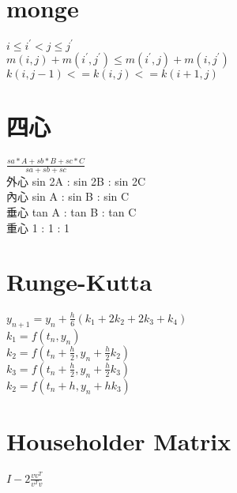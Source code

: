 \section{monge}
$i \leq i^{'} < j \leq j^{'}$ \\
$m(i,j)+m(i^{'},j^{'}) \leq m(i^{'},j)+m(i,j^{'})$ \\
$k(i,j-1)<=k(i,j)<=k(i+1,j)$

\section{四心}
$\frac{sa*A+sb*B+sc*C}{sa+sb+sc}$ \\
外心 sin 2A : sin 2B : sin 2C \\
內心 sin  A : sin  B : sin  C \\
垂心 tan  A : tan  B : tan  C \\
重心      1 :      1 :      1 

\section{Runge-Kutta}
$y_{n+1}=y_n+\frac{h}{6}(k_1+2k_2+2k_3+k_4)$\\
$k_1=f(t_n,y_n)$\\
$k_2=f(t_n+\frac{h}{2},y_n+\frac{h}{2}k_2)$\\
$k_3=f(t_n+\frac{h}{2},y_n+\frac{h}{2}k_3)$\\
$k_2=f(t_n+h,y_n+hk_3)$

\section{Householder Matrix}
$I-2\frac{vv^T}{v^Tv}$